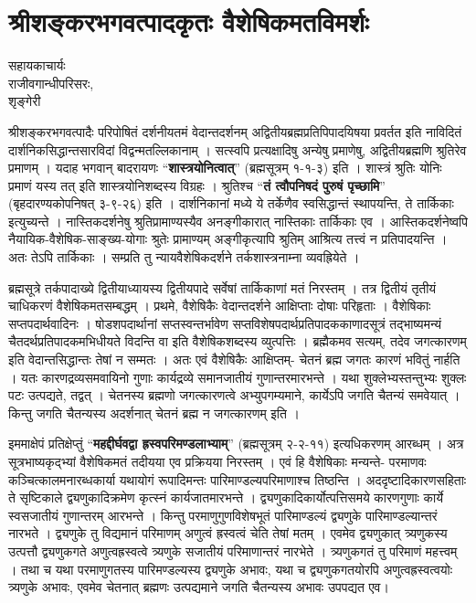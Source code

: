{\fontsize{15}{17}\selectfont
\chapter{श्रीशङ्करभगवत्पादकृतः वैशेषिकमतविमर्शः}

\begin{center}
\smallskip

सहायकाचार्यः\\
राजीवगान्धीपरिसरः,\\ 
शृङ्गेरी
\addrule
\end{center}

श्रीशङ्करभगवत्पादैः परिपोषितं दर्शनीयतमं वेदान्तदर्शनम् अद्वितीयब्रह्मप्रतिपिपादयिषया प्रवर्तत इति नाविदितं दार्शनिकसिद्धान्तसारविदां विद्वन्मतल्लिकानाम् । सत्स्वपि प्रत्यक्षादिषु अन्येषु प्रमाणेषु, अद्वितीयब्रह्मणि श्रुतिरेव प्रमाणम् । यदाह भगवान् बादरायणः “\textbf{शास्त्रयोनित्वात्}” (ब्रह्मसूत्रम् १-१-३) इति । शास्त्रं श्रुतिः योनिः प्रमाणं यस्य तत् इति शास्त्रयोनिशब्दस्य विग्रहः । श्रुतिश्च “\textbf{तं त्वौपनिषदं पुरुषं पृच्छामि}” (बृहदारण्यकोपनिषत् ३-९-२६) इति । दार्शनिकानां मध्ये ये तर्केणैव स्वसिद्धान्तं स्थापयन्ति, ते तार्किकाः इत्युच्यन्ते । नास्तिकदर्शनेषु श्रुतिप्रामाण्यस्यैव अनङ्गीकारात् नास्तिकाः तार्किकाः एव । आस्तिकदर्शनेष्वपि नैयायिक-वैशेषिक-साङ्ख्य-योगाः श्रुतेः प्रामाण्यम् अङ्गीकृत्यापि श्रुतिम् आश्रित्य तत्त्वं न प्रतिपादयन्ति । अतः तेऽपि तार्किकाः । सम्प्रति तु न्यायवैशेषिकदर्शने तर्कशास्त्रनाम्ना व्यवह्रियेते ।

ब्रह्मसूत्रे तर्कपादाख्ये द्वितीयाध्यायस्य द्वितीयपादे सर्वेषां तार्किकाणां मतं निरस्तम् । तत्र द्वितीयं तृतीयं चाधिकरणं वैशेषिकमतसम्बद्धम् । प्रथमे, वैशेषिकैः वेदान्तदर्शने आक्षिप्ताः दोषाः परिहृताः । वैशेषिकाः सप्तपदार्थवादिनः । षोडशपदार्थानां सप्तस्वन्तर्भावेण सप्तविशेषपदार्थप्रतिपादककाणादसूत्रं तद्भाष्यमन्यं चैतदर्थप्रतिपादकमभिधीयते विदन्ति वा इति वैशेषिकशब्दस्य व्युत्पत्तिः । ब्रह्मैकमव सत्यम्, तदेव जगत्कारणम् इति वेदान्तसिद्धान्तः तेषां न सम्मतः । अतः एवं वैशेषिकैः आक्षिप्तम्- चेतनं ब्रह्म जगतः कारणं भवितुं नार्हति । यतः कारणद्रव्यसमवायिनो गुणाः कार्यद्रव्ये समानजातीयं गुणान्तरमारभन्ते । यथा शुक्लेभ्यस्तन्तुभ्यः शुक्लः पटः उत्पद्यते, तद्वत् । चेतनस्य ब्रह्मणो जगत्कारणत्वे अभ्युपगम्यमाने, कार्येऽपि जगति चैतन्यं समवेयात् । किन्तु जगति चैतन्यस्य अदर्शनात् चेतनं ब्रह्म न जगत्कारणम् इति ।

इममाक्षेपं प्रतिक्षेप्तुं “\textbf{महद्दीर्घवद्वा ह्रस्वपरिमण्डलाभ्याम्}” (ब्रह्मसूत्रम् २-२-११) इत्यधिकरणम् आरब्धम् । अत्र सूत्रभाष्यकृद्भ्यां वैशेषिकमतं तदीयया एव प्रक्रियया निरस्तम् । एवं हि वैशेषिकाः मन्यन्ते- परमाणवः कञ्चित्कालमनारब्धकार्या यथायोगं रूपादिमन्तः पारिमाण्डल्यपरिमाणाश्च तिष्ठन्ति । अददृष्टादिकारणसहिताः ते सृष्टिकाले द्व्यणुकादिक्रमेण कृत्स्नं कार्यजातमारभन्ते । द्व्यणुकादिकार्योत्पत्तिसमये कारणगुणाः कार्ये स्वसजातीयं गुणान्तरम् आरभन्ते । किन्तु परमाणुगुणविशेषभूतं पारिमाण्डल्यं द्व्यणुके पारिमाण्डल्यान्तरं नारभते । द्व्यणुके तु विद्यमानं परिमाणम् अणुत्वं ह्रस्वत्वं चेति तेषां मतम् । एवमेव द्व्यणुकात् त्र्यणुकस्य उत्पत्तौ द्व्यणुकगते अणुत्वह्रस्वत्वे त्र्यणुके सजातीयं परिमाणान्तरं नारभेते । त्र्यणुकगतं तु परिमाणं महत्त्वम् । तथा च यथा परमाणुगतस्य पारिमण्डल्यस्य द्व्यणुके अभावः, यथा च द्व्यणुकगतयोरपि अणुत्वह्रस्वत्वयोः त्र्यणुके अभावः, एवमेव चेतनात् ब्रह्मणः उत्पद्यमाने जगति चैतन्यस्य अभावः उपपद्यत एव।

}
